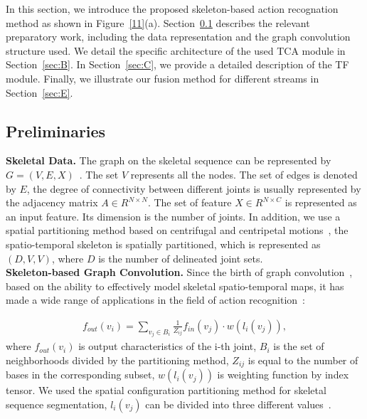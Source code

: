 \documentclass[letterpaper]{article} \usepackage[submission]{aaai23}  \usepackage{times}  \usepackage{helvet}  \usepackage{courier}  \usepackage[hyphens]{url}  \usepackage{graphicx} \urlstyle{rm} \def\UrlFont{\rm}  \usepackage{natbib}  \usepackage{caption} \frenchspacing  \setlength{\pdfpagewidth}{8.5in} \setlength{\pdfpageheight}{11in} \usepackage{algorithm}
\begin{document}
In this section, we introduce the proposed skeleton-based action recognation method as shown in Figure~\ref{11}(a). Section~\ref{sec:A} describes the relevant preparatory work, including the data representation and the graph convolution structure used. We detail the specific architecture of the used TCA module in Section~\ref{sec:B}. In Section~\ref{sec:C}, we provide a detailed description of the TF module. Finally, we illustrate our fusion method for different streams in Section~\ref{sec:E}. 


\subsection{Preliminaries}
\label{sec:A}
\noindent
{\bf Skeletal Data.} The graph on the skeletal sequence can be represented by $G=\left( V,E,X \right)$~\cite{DBLP:conf/aaai/YanXL18,2020sttr,2019Symbiotic}. The set $V$ represents all the nodes. The set of edges is denoted by $E$, the degree of connectivity between different joints is usually represented by the adjacency matrix $A\in R^{N\times N}$. The set of feature $X\in R^{N\times C}$ is represented as an input feature. Its dimension is the number of joints. In addition, we use a spatial partitioning method based on centrifugal and centripetal motions~\cite{DBLP:conf/aaai/YanXL18}, the spatio-temporal skeleton is spatially partitioned, which is represented as $(D, V, V)$, where $D$ is the number of delineated joint sets. \\
\noindent
{\bf Skeleton-based Graph Convolution.} Since the birth of graph convolution~\cite{2016Semi}, based on the ability to effectively model skeletal spatio-temporal maps, it has made a wide range of applications in the field of action recognition~\cite{DBLP:conf/aaai/YanXL18}:


\begin{align}
f_{out}(v_{i})=\sum _{v_{j}\in B_{i}}\frac{1}{Z_{ij}}f_{in}(v_{j})\cdot w(l_{i}(v_{j})),
\end{align}
where $f_{out}(v_{i})$ is output characteristics of the i-th joint, $ B_{i}$ is the  set of neighborhoods divided by the partitioning method, $Z_{ij}$ is equal to the number of bases in the corresponding subset, $w(l_{i}(v_{j}))$ is weighting function by index tensor. We used the spatial configuration partitioning method for skeletal sequence segmentation, $l_{i}(v_{j})$ can be divided into three different values~\cite{DBLP:conf/aaai/YanXL18,2020Feedback,2019Symbiotic,2020Learning,2021Channel}.
\end{document}
